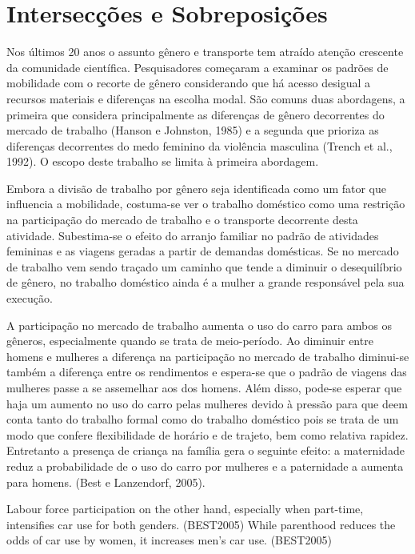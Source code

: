 \clearpage
\section{Intersecções e Sobreposições}

Nos últimos 20 anos o assunto gênero e transporte tem atraído atenção crescente da comunidade científica. Pesquisadores começaram a examinar os padrões de mobilidade com o recorte de gênero considerando que há acesso desigual a recursos materiais e diferenças na escolha modal. São comuns duas abordagens, a primeira que considera principalmente as diferenças de gênero decorrentes do mercado de trabalho (Hanson e Johnston, 1985) e a segunda que prioriza as diferenças decorrentes do medo feminino da violência masculina (Trench et al., 1992). O escopo deste trabalho se limita à primeira abordagem.

Embora a divisão de trabalho por gênero seja identificada como um fator que influencia a mobilidade, costuma-se ver o trabalho doméstico como uma restrição na participação do mercado de trabalho e o transporte decorrente desta atividade. Subestima-se o efeito do arranjo familiar no padrão de atividades femininas e as viagens geradas a partir de demandas domésticas. Se no mercado de trabalho vem sendo traçado um caminho que tende a diminuir o desequilíbrio de gênero, no trabalho doméstico ainda é a mulher a grande responsável pela sua execução.

A participação no mercado de trabalho aumenta o uso do carro para ambos os gêneros, especialmente quando se trata de meio-período. Ao diminuir entre homens e mulheres a diferença na participação no mercado de trabalho diminui-se também a diferença entre os rendimentos e espera-se que o padrão de viagens das mulheres passe a se assemelhar aos dos homens. Além disso, pode-se esperar que haja um aumento no uso do carro pelas mulheres devido à pressão para que deem conta tanto do trabalho formal como do trabalho doméstico pois se trata de um modo que confere flexibilidade de horário e de trajeto, bem como relativa rapidez. Entretanto a presença de criança na família gera o seguinte efeito: a maternidade reduz a probabilidade de o uso do carro por mulheres e a paternidade a aumenta para homens. (Best e Lanzendorf, 2005).


Labour force participation on the other hand, especially when part-time, intensifies car use for both genders. (BEST2005)
While parenthood reduces the odds of car use by women, it increases men’s car use. (BEST2005)

